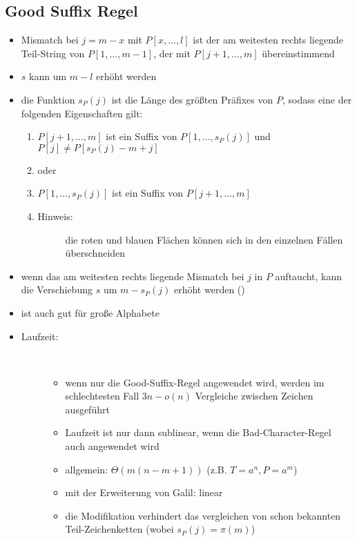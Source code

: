 \subsection{Good Suffix Regel}
\vspace*{-0.5\baselineskip}\begin{itemize}[itemsep=-1pt]
	\item Mismatch bei $j=m-x$ mit $P[x,\dots,l]$ ist der am weitesten rechts liegende Teil-String von $P[1,\dots,m-1]$, der mit $P[j+1,\dots,m]$ übereinstimmend
	\item $s$ kann um $m-l$ erhöht werden
	\item die Funktion $s_P(j)$ ist die Länge des größten Präfixes von $P$, sodass eine der folgenden Eigenschaften gilt:
		\begin{enumerate}
			\item $P[j+1,\dots,m]$ ist ein Suffix von $P[1,\dots,s_P(j)]$ und $P[j] \neq P[s_P(j)-m+j]$\\\up
				
			\item[] oder
			\item $P[1,\dots,s_P(j)]$ ist ein Suffix von $P[j+1,\dots,m]$\\\up
				
			\item[]\begin{description}
				\item[Hinweis:] die roten und blauen Flächen können sich in den einzelnen Fällen überschneiden
				\end{description} 
		\end{enumerate}
	\item wenn das am weitesten rechts liegende Mismatch bei $j$ in $P$ auftaucht, kann die Verschiebung $s$ um $m-s_P(j)$ erhöht werden ()
	\item ist auch gut für große Alphabete
	\item \begin{description}
		\item[Laufzeit:]\ \\\up
			\begin{itemize}
				\item wenn nur die Good-Suffix-Regel angewendet wird, werden im schlechtesten Fall $3n-o(n)$ Vergleiche zwischen Zeichen ausgeführt
				\item Laufzeit ist nur dann sublinear, wenn die Bad-Character-Regel auch angewendet wird
				\item allgemein: $\Theta(m(n-m+1))$ (z.B. $T=a^n,P=a^m$)
				\item mit der Erweiterung von Galil: linear
				\item die Modifikation verhindert das vergleichen von schon bekannten Teil-Zeichenketten (wobei $s_P(j)=\pi(m)$)
			\end{itemize}
	\end{description}
\end{itemize}
